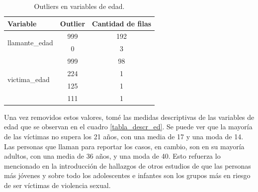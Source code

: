 \documentclass[10 pt]{article}
\begin{document}
\begin{table}[H] 
    \centering
    \caption{Outliers en variables de edad.}
    \label{tabla_out}
    \begin{tabular}{|l|c|c|}
    \hline
    \textbf{Variable}                        & \textbf{Outlier} & \textbf{Cantidad de filas} \\ \hline
    \multirow{2}{*}{llamante\_edad} & 999     & 192               \\ \cline{2-3} 
                                    & 0       & 3                 \\ \hline
    \multirow{4}{*}{victima\_edad}  & 999     & 98                \\ \cline{2-3} 
                                    & 224     & 1                 \\ \cline{2-3} 
                                    & 125     & 1                 \\ \cline{2-3} 
                                    & 111     & 1                 \\ \hline
    \end{tabular}
    \end{table}

Una vez removidos estos valores, tomé las medidas descriptivas de las variables de edad que se observan en el cuadro \ref{tabla_descr_ed}. Se puede ver que la mayoría de las víctimas no supera los 21 años, con una media de 17 y una moda de 14. Las personas que llaman para reportar los casos, en cambio, son en su mayoría adultos, con una media de 36 años, y una moda de 40. Esto refuerza lo mencionado en la introducción de hallazgos de otros estudios de que las personas más jóvenes y sobre todo los adolescentes e infantes son los grupos más en riesgo de ser víctimas de violencia sexual. 
\end{document}
